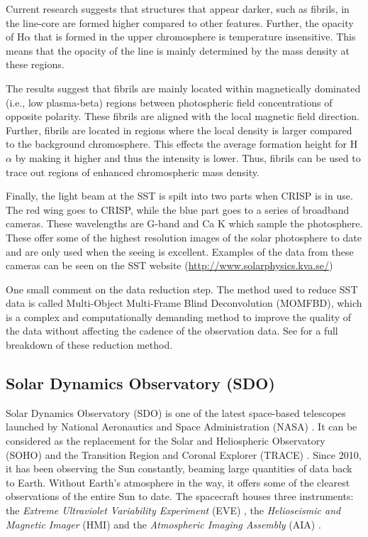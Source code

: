     Current research suggests that structures that appear darker, such as fibrils, in the line-core are formed higher compared to other features.
    Further, the opacity of H$\alpha$ that is formed in the upper chromosphere is temperature insensitive.
    This means that the opacity of the line is mainly determined by the mass density at these regions.
    
    The results suggest that fibrils are mainly located within magnetically dominated (i.e., low plasma-beta) regions between photospheric field concentrations of opposite polarity.
    These fibrils are aligned with the local magnetic field direction.
    Further, fibrils are located in regions where the local density is larger compared to the background chromosphere. 
    This effects the average formation height for H$\alpha$ by making it higher and thus the intensity is lower.
    Thus, fibrils can be used to trace out regions of enhanced chromospheric mass density. 
    
    Finally, the light beam at the SST is spilt into two parts when CRISP is in use.
    The red wing goes to CRISP, while the blue part goes to a series of broadband cameras.
    These wavelengths are G-band and Ca K which sample the photosphere.
    These offer some of the highest resolution images of the solar photosphere to date and are only used when the seeing is excellent. 
    Examples of the data from these cameras can be seen on the SST website (\url{http://www.solarphysics.kva.se/})
    
    One small comment on the data reduction step.
    The method used to reduce SST data is called Multi-Object Multi-Frame Blind Deconvolution (MOMFBD), which is a complex and computationally demanding method to improve the quality of the data without affecting the cadence of the observation data. 
    See \cite{Noort2005} for a full breakdown of these reduction method. 
    
\subsection{Solar Dynamics Observatory (SDO)}

	Solar Dynamics Observatory (SDO) is one of the latest space-based telescopes launched by National Aeronautics and Space Administration (NASA) \citep{2012SoPh..275...17L}.
	It can be considered as the replacement for the Solar and Heliospheric Observatory (SOHO) \citep{domingo1995soho} and the Transition Region and Coronal Explorer (TRACE) \citep{TRACE}.
    Since 2010, it has been observing the Sun constantly, beaming large quantities of data back to Earth.
	Without Earth's atmosphere in the way, it offers some of the clearest observations of the entire Sun to date. 
	The spacecraft houses three instruments: the \textit{Extreme Ultraviolet Variability Experiment} (EVE) \citep{2012SoPh..275..115W}, the \textit{Helioseismic and Magnetic Imager} (HMI) \citep{2012SoPh..275..229S} and the \textit{Atmospheric Imaging Assembly} (AIA) \citep{2012SoPh..275...17L}.
	 
